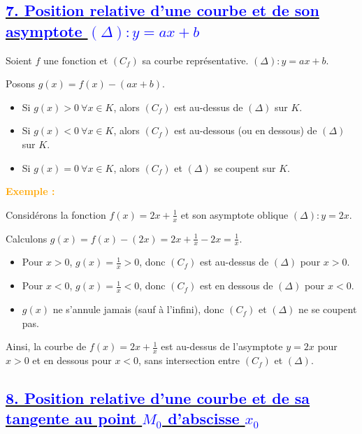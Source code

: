 \documentclass{article}
\newcounter{exemple}
\newcommand{\exemple}{%
  \refstepcounter{exemple}%
  \textbf{\textcolor{orange}{Exemple \theexemple : }} \ignorespaces
}
\begin{document}
\subsection*{\underline{\textbf{\textcolor{blue}{7. Position relative d’une courbe et de son asymptote \( (\Delta): y = ax + b \)}}}}

Soient $f$ une fonction et $(C_f)$ sa courbe représentative. $(\Delta) : y = ax + b$.

Posons $g(x) = f(x) - (ax + b)$.

\begin{itemize}
    \item Si $g(x) > 0 \ \forall x \in K$, alors $(C_f)$ est au-dessus de $(\Delta)$ sur $K$.
    \item Si $g(x) < 0 \ \forall x \in K$, alors $(C_f)$ est au-dessous (ou en dessous) de $(\Delta)$ sur $K$.
    \item Si $g(x) = 0 \ \forall x \in K$, alors $(C_f)$ et $(\Delta)$ se coupent sur $K$.
\end{itemize}

\textbf{\exemple}

Considérons la fonction \( f(x) = 2x + \frac{1}{x} \) et son asymptote oblique \( (\Delta) : y = 2x \).

Calculons \( g(x) = f(x) - (2x) = 2x + \frac{1}{x} - 2x = \frac{1}{x} \).

\begin{itemize}
    \item Pour \( x > 0 \), \( g(x) = \frac{1}{x} > 0 \), donc \( (C_f) \) est au-dessus de \( (\Delta) \) pour \( x > 0 \).
    \item Pour \( x < 0 \), \( g(x) = \frac{1}{x} < 0 \), donc \( (C_f) \) est en dessous de \( (\Delta) \) pour \( x < 0 \).
    \item \( g(x) \) ne s'annule jamais (sauf à l'infini), donc \( (C_f) \) et \( (\Delta) \) ne se coupent pas.
\end{itemize}

Ainsi, la courbe de \( f(x) = 2x + \frac{1}{x} \) est au-dessus de l'asymptote \( y = 2x \) pour \( x > 0 \) et en dessous pour \( x < 0 \), sans intersection entre \( (C_f) \) et \( (\Delta) \).

\subsection*{\underline{\textbf{\textcolor{blue}{8. Position relative d’une courbe et de sa tangente au point \( M_{0} \)  d'abscisse \( x_{0} \)}}}}
\end{document}
